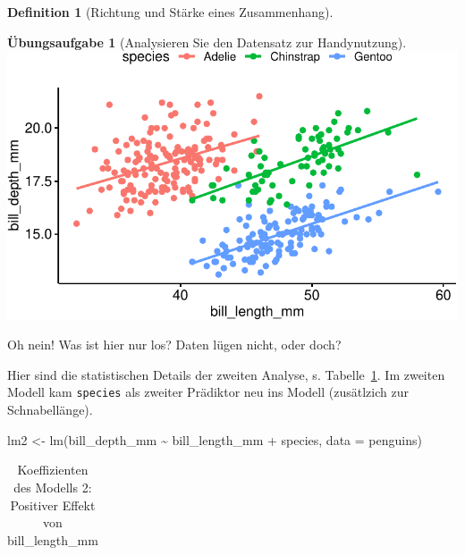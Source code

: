 \documentclass[
  a4paper,
  DIV=11]{scrreprt}
\newenvironment{Shaded}{\begin{snugshade}}{\end{snugshade}}
\newcommand{\AttributeTok}[1]{\textcolor[rgb]{0.40,0.45,0.13}{#1}}
\newcommand{\FunctionTok}[1]{\textcolor[rgb]{0.28,0.35,0.67}{#1}}
\newcommand{\NormalTok}[1]{\textcolor[rgb]{0.00,0.23,0.31}{#1}}
\newcommand{\OtherTok}[1]{\textcolor[rgb]{0.00,0.23,0.31}{#1}}
\newcommand{\SpecialCharTok}[1]{\textcolor[rgb]{0.37,0.37,0.37}{#1}}
\theoremstyle{definition}
\newtheorem{exercise}{Übungsaufgabe}[chapter]
\theoremstyle{definition}
\theoremstyle{definition}
\newtheorem{definition}{Definition}[chapter]
\theoremstyle{remark}
\begin{document}
\begin{definition}[Richtung und Stärke eines
Zusammenhang]
\begin{exercise}[Analysieren Sie den Datensatz zur
Handynutzung]
\includegraphics{090-regression2_files/figure-pdf/unnamed-chunk-64-1.pdf}

Oh nein! Was ist hier nur los? Daten lügen nicht, oder doch?

Hier sind die statistischen Details der zweiten Analyse, s.
Tabelle~\ref{tbl-peng-simpson2}. Im zweiten Modell kam \texttt{species}
als zweiter Prädiktor neu ins Modell (zusätlzich zur Schnabellänge).

\begin{Shaded}
\begin{Highlighting}[]
\NormalTok{lm2 }\OtherTok{\textless{}{-}} \FunctionTok{lm}\NormalTok{(bill\_depth\_mm }\SpecialCharTok{\textasciitilde{}}\NormalTok{ bill\_length\_mm }\SpecialCharTok{+}\NormalTok{ species, }\AttributeTok{data =}\NormalTok{ penguins)}
\end{Highlighting}
\end{Shaded}

\begin{longtable}[]{@{}
  >{\raggedright\arraybackslash}p{}
  >{\centering\arraybackslash}p{}
  >{\centering\arraybackslash}p{}
  >{\centering\arraybackslash}p{}
  >{\centering\arraybackslash}p{}
  >{\centering\arraybackslash}p{}@{}}

\caption{\label{tbl-peng-simpson2}Koeffizienten des Modells 2: Positiver
Effekt von bill\_length\_mm}

\tabularnewline


\end{longtable}
\end{exercise}
\end{definition}
\end{document}
